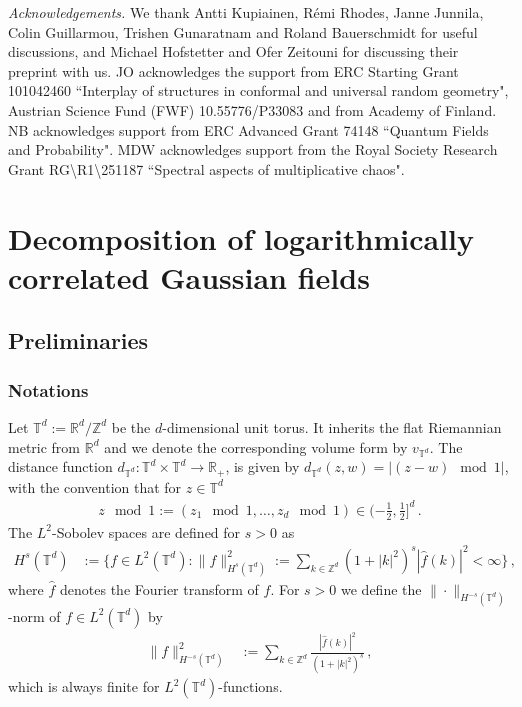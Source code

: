 \documentclass[11pt]{article}
\numberwithin{equation}{section}
\theoremstyle{definition}
\newcommand{\R}{\mathbb{R}}
\newcommand{\Z}{\mathbb{Z}}
\def\T{\mathbb{T}}
\newcommand{\F}[1]{ { \hat{#1} } }
\begin{document}
\emph{Acknowledgements.} We thank Antti Kupiainen, Rémi Rhodes, Janne Junnila, Colin Guillarmou, Trishen Gunaratnam and Roland Bauerschmidt for useful discussions, and Michael Hofstetter and Ofer Zeitouni for discussing their preprint \cite{HZ} with us. JO acknowledges the support from ERC Starting Grant 101042460 “Interplay of structures in conformal and universal random geometry", Austrian Science Fund (FWF) 10.55776/P33083 and from Academy of Finland. NB acknowledges support from ERC Advanced Grant 74148 “Quantum Fields and Probability". MDW acknowledges support from the Royal Society Research Grant RG\textbackslash R1\textbackslash 251187 “Spectral aspects of multiplicative chaos".





\section{Decomposition of logarithmically correlated Gaussian fields}\label{sec:prel}

\subsection{Preliminaries}

\subsubsection{Notations}


Let $\T^d := \R^d/\Z^d$ be the $d$-dimensional unit torus. It inherits the flat Riemannian metric from $\R^d$ and we denote the corresponding volume form by $v_{\T^d}$. The distance function $d_{\T^d}: \T^d \times \T^d \to \R_+$, is given by $d_{\T^d}(z,w) = |(z-w) \mod 1|$, with the convention that for $z \in \T^d$
\begin{align}
z \mod 1 := (z_1 \mod 1, \hdots, z_d \mod 1) \in (- \tfrac{1}{2},\tfrac{1}{2}]^d\,.
\end{align}
The $L^2$-Sobolev spaces are defined for $s > 0$ as
\begin{align*}
H^s(\T^d) &:= \Big\{ f \in L^2(\T^d) : \|f\|_{H^s(\T^d)}^2 := \sum_{k \in \Z^d} (1+|k|^2)^s | \F{f}(k)|^2 < \infty \Big\}\,,
\end{align*}
where $\F{f}$ denotes the Fourier transform of $f$. For $s > 0$ we define the $\| \cdot \|_{H^{-s}(\T^d)}$-norm of $f \in L^2(\T^d)$ by
\begin{align*}
\|f\|_{H^{-s}(\T^d)}^2 &:= \sum_{k \in \Z^d} \frac{|\hat f (k)|^2}{(1+|k|^2)^s}\,,
\end{align*}
which is always finite for $L^2(\T^d)$-functions.
\end{document}
